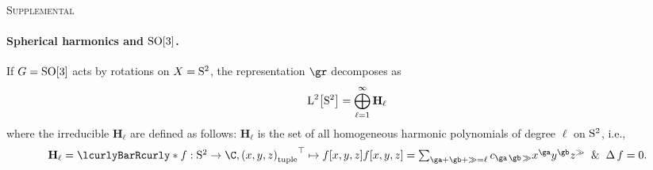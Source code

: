 \documentclass[10pt]{article}
\newenvironment{supplemental}{
\begin{flushright}
\textsc{Supplemental}
\end{flushright}}{}
\begin{document}
\begin{supplemental}
\paragraph{Spherical harmonics and $\SpecialOrthogonalGroup\of 3$.} 
\newcommand{\degL}{\ell}
\newcommand{\Harmonic}[1]{\mathbf{H}_{#1}}
If $G=\SpecialOrthogonalGroup\of 3$ acts by rotations on $X=\mathrm{S}^{2}$, the representation $\gr$ decomposes as 
\begin{equation*}
\Lspace[2]\of{\UnitSphere 2} = \DirectSum{\degL=1}[\infty] \Harmonic\degL
\end{equation*}
where the irreducible $\Harmonic\degL$ are defined as follows: $\Harmonic\degL$ is the set of all homogeneous harmonic polynomials of degree $\degL$ on $\mathrm{S}^{2}$, i.e.,
\begin{equation*}
\Harmonic\degL = \setst{\FunctionSpec f {\UnitSphere 2} \C, \FunctionBody {\Transpose{\tuple{x,y,z}}} {f\of{x,y,z}}}{f\of{x,y,z} = \sum {\ga+\gb+\gg = \degL} c_{\ga\,\gb\,\gg} x^{\ga}y^{\gb}z^{\gg} \And \Laplacian f = 0  }.
\end{equation*}

\endgroup
\end{supplemental}
\end{document}
